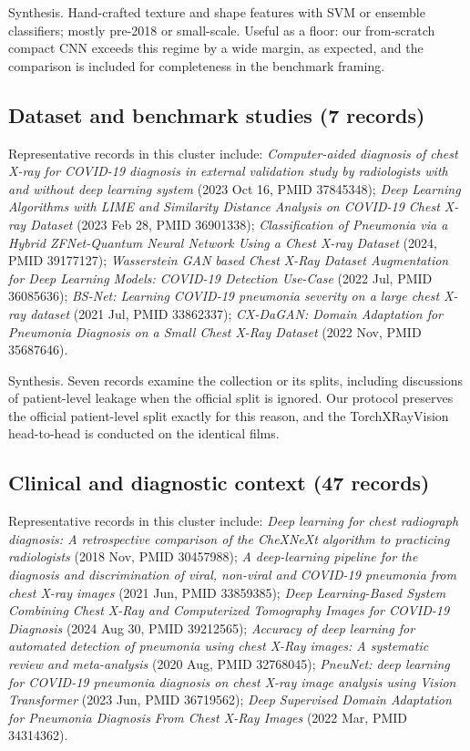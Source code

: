 Synthesis. Hand-crafted texture and shape features with SVM or ensemble classifiers; mostly pre-2018 or small-scale. Useful as a floor: our from-scratch compact CNN exceeds this regime by a wide margin, as expected, and the comparison is included for completeness in the benchmark framing.


\subsection*{Dataset and benchmark studies (7 records)}
Representative records in this cluster include: \emph{Computer-aided diagnosis of chest X-ray for COVID-19 diagnosis in external validation study by radiologists with and without deep learning system} (2023 Oct 16, PMID 37845348); \emph{Deep Learning Algorithms with LIME and Similarity Distance Analysis on COVID-19 Chest X-ray Dataset} (2023 Feb 28, PMID 36901338); \emph{Classification of Pneumonia via a Hybrid ZFNet-Quantum Neural Network Using a Chest X-ray Dataset} (2024, PMID 39177127); \emph{Wasserstein GAN based Chest X-Ray Dataset Augmentation for Deep Learning Models: COVID-19 Detection Use-Case} (2022 Jul, PMID 36085636); \emph{BS-Net: Learning COVID-19 pneumonia severity on a large chest X-ray dataset} (2021 Jul, PMID 33862337); \emph{CX-DaGAN: Domain Adaptation for Pneumonia Diagnosis on a Small Chest X-Ray Dataset} (2022 Nov, PMID 35687646).\par

Synthesis. Seven records examine the collection or its splits, including discussions of patient-level leakage when the official split is ignored. Our protocol preserves the official patient-level split exactly for this reason, and the TorchXRayVision head-to-head is conducted on the identical films.


\subsection*{Clinical and diagnostic context (47 records)}
Representative records in this cluster include: \emph{Deep learning for chest radiograph diagnosis: A retrospective comparison of the CheXNeXt algorithm to practicing radiologists} (2018 Nov, PMID 30457988); \emph{A deep-learning pipeline for the diagnosis and discrimination of viral, non-viral and COVID-19 pneumonia from chest X-ray images} (2021 Jun, PMID 33859385); \emph{Deep Learning-Based System Combining Chest X-Ray and Computerized Tomography Images for COVID-19 Diagnosis} (2024 Aug 30, PMID 39212565); \emph{Accuracy of deep learning for automated detection of pneumonia using chest X-Ray images: A systematic review and meta-analysis} (2020 Aug, PMID 32768045); \emph{PneuNet: deep learning for COVID-19 pneumonia diagnosis on chest X-ray image analysis using Vision Transformer} (2023 Jun, PMID 36719562); \emph{Deep Supervised Domain Adaptation for Pneumonia Diagnosis From Chest X-Ray Images} (2022 Mar, PMID 34314362).\par

